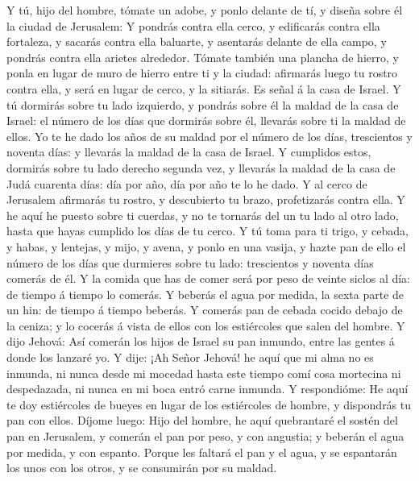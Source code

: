  Y tú, hijo del hombre, tómate un adobe, y ponlo delante
de tí, y diseña sobre él la ciudad de Jerusalem:  Y
pondrás contra ella cerco, y edificarás contra ella fortaleza, y sacarás
contra ella baluarte, y asentarás delante de ella campo, y pondrás
contra ella arietes alrededor.  Tómate también una plancha
de hierro, y ponla en lugar de muro de hierro entre ti y la ciudad:
afirmarás luego tu rostro contra ella, y será en lugar de cerco, y la
sitiarás. Es señal á la casa de Israel.  Y tú dormirás
sobre tu lado izquierdo, y pondrás sobre él la maldad de la casa de
Israel: el número de los días que dormirás sobre él, llevarás sobre ti
la maldad de ellos.  Yo te he dado los años de su maldad
por el número de los días, trescientos y noventa días: y llevarás la
maldad de la casa de Israel.  Y cumplidos estos, dormirás
sobre tu lado derecho segunda vez, y llevarás la maldad de la casa de
Judá cuarenta días: día por año, día por año te lo he dado.
 Y al cerco de Jerusalem afirmarás tu rostro, y
descubierto tu brazo, profetizarás contra ella.  Y he aquí
he puesto sobre ti cuerdas, y no te tornarás del un tu lado al otro
lado, hasta que hayas cumplido los días de tu cerco.  Y tú
toma para ti trigo, y cebada, y habas, y lentejas, y mijo, y avena, y
ponlo en una vasija, y hazte pan de ello el número de los días que
durmieres sobre tu lado: trescientos y noventa días comerás de él.
 Y la comida que has de comer será por peso de veinte
siclos al día: de tiempo á tiempo lo comerás.  Y beberás
el agua por medida, la sexta parte de un hin: de tiempo á tiempo
beberás.  Y comerás pan de cebada cocido debajo de la
ceniza; y lo cocerás á vista de ellos con los estiércoles que salen del
hombre.  Y dijo Jehová: Así comerán los hijos de Israel
su pan inmundo, entre las gentes á donde los lanzaré yo. 
Y dije: ¡Ah Señor Jehová! he aquí que mi alma no es inmunda, ni nunca
desde mi mocedad hasta este tiempo comí cosa mortecina ni despedazada,
ni nunca en mi boca entró carne inmunda.  Y respondióme:
He aquí te doy estiércoles de bueyes en lugar de los estiércoles de
hombre, y dispondrás tu pan con ellos.  Díjome luego:
Hijo del hombre, he aquí quebrantaré el sostén del pan en Jerusalem, y
comerán el pan por peso, y con angustia; y beberán el agua por medida, y
con espanto.  Porque les faltará el pan y el agua, y se
espantarán los unos con los otros, y se consumirán por su maldad.

